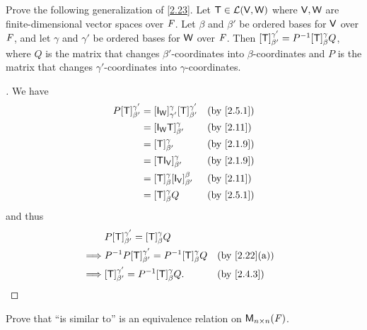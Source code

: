 \exercisesection

\setcounter{ex}{7}
\begin{ex}\label{ex:2.5.8}
	Prove the following generalization of \cref{2.23}.
	Let \(\mathsf{T} \in \mathcal{L}(\mathsf{V}, \mathsf{W})\) where \(\mathsf{V}, \mathsf{W}\) are finite-dimensional vector spaces over \(\mathit{F}\).
	Let \(\beta\) and \(\beta'\) be ordered bases for \(\mathsf{V}\) over \(\mathit{F}\), and let \(\gamma\) and \(\gamma'\) be ordered bases for \(\mathsf{W}\) over \(\mathit{F}\).
	Then \([\mathsf{T}]_{\beta'}^{\gamma'} = P^{-1} [\mathsf{T}]_{\beta}^{\gamma} Q\), where \(Q\) is the matrix that changes \(\beta'\)-coordinates into \(\beta\)-coordinates and \(P\) is the matrix that changes \(\gamma'\)-coordinates into \(\gamma\)-coordinates.
\end{ex}

\begin{proof}[]
	We have
	\begin{align*}
		P [\T]_{\beta'}^{\gamma'} & = [\IT[\W]]_{\gamma'}^{\gamma} [\T]_{\beta'}^{\gamma'} &  & \by{2.5.1} \\
		                          & = [\IT[\W] \T]_{\beta'}^{\gamma}                       &  & \by{2.11}  \\
		                          & = [\T]_{\beta'}^{\gamma}                               &  & \by{2.1.9} \\
		                          & = [\T \IT[\V]]_{\beta'}^{\gamma}                       &  & \by{2.1.9} \\
		                          & = [\T]_{\beta}^{\gamma} [\IT[\V]]_{\beta'}^{\beta}     &  & \by{2.11}  \\
		                          & = [\T]_{\beta}^{\gamma} Q                              &  & \by{2.5.1}
	\end{align*}
	and thus
	\begin{align*}
		         & P [\T]_{\beta'}^{\gamma'} = [\T]_{\beta}^{\gamma} Q                                 \\
		\implies & P^{-1} P [\T]_{\beta'}^{\gamma'} = P^{-1} [\T]_{\beta}^{\gamma} Q &  & \by{2.22}[a] \\
		\implies & [\T]_{\beta'}^{\gamma'} = P^{-1} [\T]_{\beta}^{\gamma} Q.         &  & \by{2.4.3}
	\end{align*}
\end{proof}

\begin{ex}\label{ex:2.5.9}
	Prove that ``is similar to'' is an equivalence relation on \(\mathsf{M}_{{n} \times n}({\mathit{F}})\).
\end{ex}

